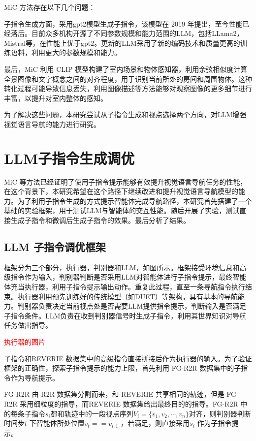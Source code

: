 \documentclass[bachelor]{thesis-uestc}
\begin{document}
MiC 方法存在以下几个问题：

子指令生成方面，采用gpt2模型生成子指令，该模型在 2019 年提出，至今性能已经落后。目前众多机构开源了不同参数规模和能力范围的LLM，包括LLama2，Mistral等，在性能上优于gpt2。更新的LLM采用了新的编码技术和质量更高的训练语料，利用更大的参数规模和能力。

最后，MiC 利用 CLIP 模型构建了室内场景和物体感知器，利用余弦相似度计算全景图像和文字概念之间的对齐程度，用于识别当前所处的房间和周围物体。这种转化过程可能导致信息丢失，利用图像描述等方法能够对观察图像的更多细节进行丰富，以提升对室内整体的感知。

为了解决这些问题，本研究尝试从子指令生成和视点选择两个方向，对LLM增强视觉语言导航的能力进行研究。

\section{LLM子指令生成调优}

MiC 等方法已经证明了使用子指令提示能够有效提升视觉语言导航任务的性能，在这个背景下，本研究希望在这个路径下继续改进和提升视觉语言导航模型的能力。为了利用子指令生成的方式提示智能体完成导航路径，本研究首先搭建了一个基础的实验框架，用于测试LLM与智能体的交互性能。随后开展了实验，测试直接生成子指令和微调后生成子指令的效果。最后分析了结果。

\subsection{LLM 子指令调优框架}

框架分为三个部分，执行器，判别器和LLM，如图所示。框架接受环境信息和高级指令作为输入，判别器判断是否采用LLM对智能体进行子指令提示，最终智能体充当执行器，利用子指令提示输出动作。重复此过程，直至一条导航指令执行结束。执行器利用预先训练好的传统模型（如DUET）等架构，具有基本的导航能力。判别器负责决定当前视点处是否需要LLM提供指令提示，判断输入是否满足子指令条件。LLM负责在收到判别器信号时生成子指令，利用其世界知识对导航任务做出指导。

\textcolor{red}{执行器的图片}

子指令和REVERIE 数据集中的高级指令直接拼接后作为执行器的输入。为了验证框架的正确性，探索子指令提示的能力上限，首先利用 FG-R2R 数据集中的子指令作为导航提示。

FG-R2R 由 R2R 数据集分割而来，和 REVERIE 共享相同的轨迹，但是 FG-R2R 采用细粒度的指导，而REVERIE 数据集给出最终目的的指导。FG-R2R 中的每条子指令$s_i$都和轨迹中的一段视点序列$V_i=\{v_1,v_2,\cdots,v_n\}$对齐，则判别器判断时间步$t$ 下智能体所处位置$v_t == v_{i,1}$  ，若满足，则直接采用$s_i$ 作为子指令提示。
\end{document}
